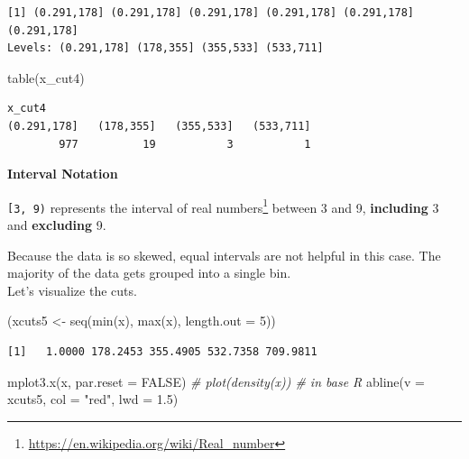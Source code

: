 \documentclass[
]{book}
\newenvironment{Shaded}{\begin{snugshade}}{\end{snugshade}}
\newcommand{\AttributeTok}[1]{\textcolor[rgb]{0.77,0.63,0.00}{#1}}
\newcommand{\CommentTok}[1]{\textcolor[rgb]{0.56,0.35,0.01}{\textit{#1}}}
\newcommand{\ConstantTok}[1]{\textcolor[rgb]{0.00,0.00,0.00}{#1}}
\newcommand{\DecValTok}[1]{\textcolor[rgb]{0.00,0.00,0.81}{#1}}
\newcommand{\FloatTok}[1]{\textcolor[rgb]{0.00,0.00,0.81}{#1}}
\newcommand{\FunctionTok}[1]{\textcolor[rgb]{0.00,0.00,0.00}{#1}}
\newcommand{\NormalTok}[1]{#1}
\newcommand{\OtherTok}[1]{\textcolor[rgb]{0.56,0.35,0.01}{#1}}
\newcommand{\StringTok}[1]{\textcolor[rgb]{0.31,0.60,0.02}{#1}}
\DeclareRobustCommand{\href}[2]{#2\footnote{\url{#1}}}
\begin{document}
\begin{verbatim}
[1] (0.291,178] (0.291,178] (0.291,178] (0.291,178] (0.291,178] (0.291,178]
Levels: (0.291,178] (178,355] (355,533] (533,711]
\end{verbatim}

\begin{Shaded}
\begin{Highlighting}[]
\FunctionTok{table}\NormalTok{(x\_cut4)}
\end{Highlighting}
\end{Shaded}

\begin{verbatim}
x_cut4
(0.291,178]   (178,355]   (355,533]   (533,711] 
        977          19           3           1 
\end{verbatim}

\begin{rmdtip}
\textbf{Interval Notation}

\texttt{{[}3,\ 9)} represents the interval of
\href{https://en.wikipedia.org/wiki/Real_number}{real numbers} between 3
and 9, \textbf{including} 3 and \textbf{excluding} 9.
\end{rmdtip}

Because the data is so skewed, equal intervals are not helpful in this case. The majority of the data gets grouped into a single bin.\\
Let's visualize the cuts.

\begin{Shaded}
\begin{Highlighting}[]
\NormalTok{(xcuts5 }\OtherTok{\textless{}{-}} \FunctionTok{seq}\NormalTok{(}\FunctionTok{min}\NormalTok{(x), }\FunctionTok{max}\NormalTok{(x), }\AttributeTok{length.out =} \DecValTok{5}\NormalTok{))}
\end{Highlighting}
\end{Shaded}

\begin{verbatim}
[1]   1.0000 178.2453 355.4905 532.7358 709.9811
\end{verbatim}

\begin{Shaded}
\begin{Highlighting}[]
\FunctionTok{mplot3.x}\NormalTok{(x, }\AttributeTok{par.reset =} \ConstantTok{FALSE}\NormalTok{)}
\CommentTok{\# plot(density(x)) \# in base R}
\FunctionTok{abline}\NormalTok{(}\AttributeTok{v =}\NormalTok{ xcuts5, }\AttributeTok{col =} \StringTok{"red"}\NormalTok{, }\AttributeTok{lwd =} \FloatTok{1.5}\NormalTok{)}
\end{Highlighting}
\end{Shaded}
\end{document}
